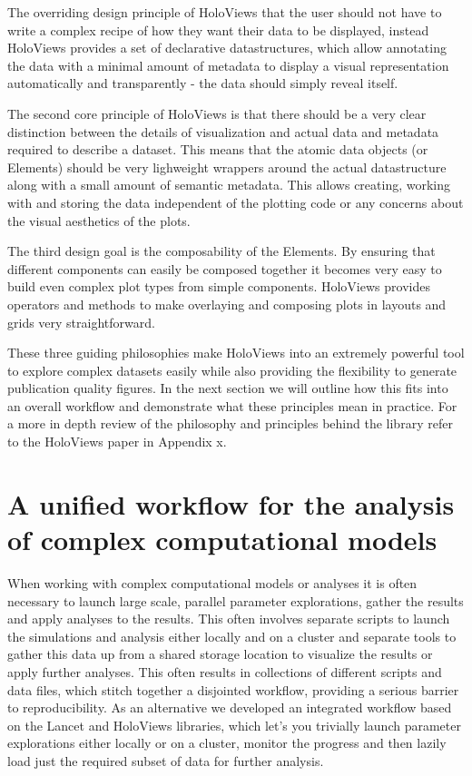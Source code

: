 The overriding design principle of HoloViews that the user should not
have to write a complex recipe of how they want their data to be
displayed, instead HoloViews provides a set of declarative
datastructures, which allow annotating the data with a minimal amount
of metadata to display a visual representation automatically and
transparently - the data should simply reveal itself.

The second core principle of HoloViews is that there should be a very
clear distinction between the details of visualization and actual data
and metadata required to describe a dataset. This means that the
atomic data objects (or Elements) should be very lighweight wrappers
around the actual datastructure along with a small amount of semantic
metadata. This allows creating, working with and storing the data
independent of the plotting code or any concerns about the visual
aesthetics of the plots.

The third design goal is the composability of the Elements. By
ensuring that different components can easily be composed together it
becomes very easy to build even complex plot types from simple
components. HoloViews provides operators and methods to make
overlaying and composing plots in layouts and grids very
straightforward.

These three guiding philosophies make HoloViews into an extremely
powerful tool to explore complex datasets easily while also providing
the flexibility to generate publication quality figures. In the next
section we will outline how this fits into an overall workflow and
demonstrate what these principles mean in practice. For a more in
depth review of the philosophy and principles behind the library refer
to the HoloViews paper in Appendix x.


\section{A unified workflow for the analysis of complex computational models}

When working with complex computational models or analyses it is often
necessary to launch large scale, parallel parameter explorations,
gather the results and apply analyses to the results. This often
involves separate scripts to launch the simulations and analysis
either locally and on a cluster and separate tools to gather this data
up from a shared storage location to visualize the results or apply
further analyses. This often results in collections of different
scripts and data files, which stitch together a disjointed workflow,
providing a serious barrier to reproducibility. As an alternative we
developed an integrated workflow based on the Lancet and HoloViews
libraries, which let's you trivially launch parameter explorations
either locally or on a cluster, monitor the progress and then lazily
load just the required subset of data for further analysis.

